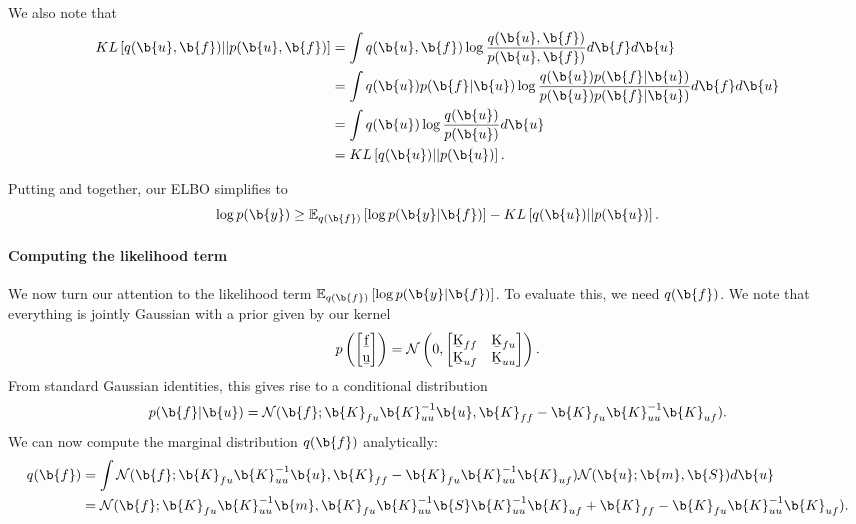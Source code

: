 We also note that
\begin{align}
    \label{eq:kl}
    KL \left [ q(\b{u}, \b{f}) || p(\b{u}, \b{f}) \right ]
    &= \int q(\b{u}, \b{f}) \log \frac{q(\b{u}, \b{f})}{p(\b{u}, \b{f})} d\b{f} d\b{u}\\
    &= \int q(\b{u}) p(\b{f}|\b{u}) \log \frac{q(\b{u}) p(\b{f} | \b{u})}{p(\b{u}) p(\b{f} | \b{u})} d\b{f} d\b{u}\\
    &= \int q(\b{u}) \log \frac{q(\b{u})}{p(\b{u})} d\b{u}\\
    &= KL \left [ q(\b{u}) || p(\b{u}) \right ].
\end{align}

Putting  and  together, our ELBO simplifies to
\begin{equation}
    \log p(\b{y}) \geq \mathbb{E}_{q(\b{f})} \left [ \log p(\b{y} | \b{f}) \right ] - KL \left [ q(\b{u}) || p(\b{u}) \right ].
\end{equation}

\paragraph*{Computing the likelihood term}

We now turn our attention to the likelihood term $\mathbb{E}_{q(\b{f})} \left [ \log p(\b{y} | \b{f}) \right ]$.
To evaluate this, we need $q(\b{f})$.
We note that everything is jointly Gaussian with a prior given by our kernel
\begin{equation}
    p \left ( \begin{bmatrix} \b{f}\\ \b{u} \end{bmatrix} \right )
    = \mathcal{N} \left ( 0, \begin{bmatrix} \b{K}_{ff} & \b{K}_{fu}\\ 
        \b{K}_{uf} & \b{K}_{uu} \end{bmatrix} \right ).
\end{equation}
From standard Gaussian identities, this gives rise to a conditional distribution
\begin{equation}
    \label{eq:cond_pfu}
    p(\b{f} | \b{u}) = \mathcal{N} (  \b{f}; \b{K}_{fu} \b{K}_{uu}^{-1} \b{u}, \b{K}_{ff} - \b{K}_{fu} \b{K}_{uu}^{-1} \b{K}_{uf} ).
\end{equation}
We can now compute the marginal distribution $q(\b{f})$ analytically:
\begin{align}
    q(\b{f}) &= \int \mathcal{N} ( \b{f}; \b{K}_{fu} \b{K}_{uu}^{-1} \b{u}, \b{K}_{ff} - \b{K}_{fu} \b{K}_{uu}^{-1} \b{K}_{uf} ) \mathcal{N}(\b{u}; \b{m}, \b{S}) d \b{u}\\
    &= \mathcal{N} ( \b{f}; \b{K}_{fu} \b{K}_{uu}^{-1} \b{m},
    \b{K}_{fu} \b{K}_{uu}^{-1} \b{S} \b{K}_{uu}^{-1} \b{K}_{uf} + \b{K}_{ff} - \b{K}_{fu} \b{K}_{uu}^{-1} \b{K}_{uf} ).
    \label{eq:marg_pf}
\end{align}


